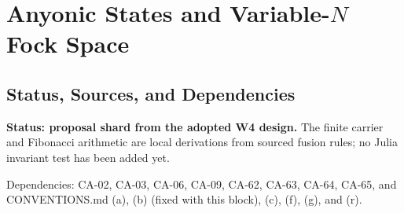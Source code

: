 
\section{Anyonic States and Variable-\(N\) Fock Space}
\label{sec:anyonic-states-variable-n-fock}

\subsection{Status, Sources, and Dependencies}

\textbf{Status: proposal shard from the adopted W4 design.}  The finite
carrier and Fibonacci arithmetic are local derivations from sourced fusion
rules; no Julia invariant test has been added yet.

Dependencies: CA-02, CA-03, CA-06, CA-09, CA-62, CA-63, CA-64, CA-65,
and CONVENTIONS.md (a), (b) (fixed with this block), (c), (f), (g), and (r).


